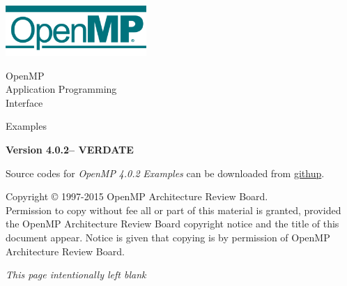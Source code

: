 
\newcommand{\VER}{4.0.2}
\newcommand{\VERDATE}{March 2015}

  \begin{titlepage}
    \begin{flushleft}
     \hspace{-6em} \includegraphics[width=0.4\textwidth]{openmp-logo.png}
    \end{flushleft}

    \begin{adjustwidth}{-0.75in}{0in}
    \begin{center}
      \Huge
      \textsf{OpenMP\\Application Programming\\Interface}

      \vspace{0.5in}\textsf{Examples}\vspace{-0.7in}
      \normalsize

      \vspace{1.0in}

      \textbf{Version \VER -- VERDATE}
    \end{center}
    \end{adjustwidth}

    \vspace{2.3in} %

Source codes for \emph{OpenMP} \emph{\VER} \emph{Examples} can be downloaded from
 \href{https://github.com/OpenMP/Examples/tree/v\VER}{githup}.\\

\begin{adjustwidth}{0pt}{1em}\setlength{\parskip}{0.25\baselineskip}%
Copyright © 1997-2015 OpenMP Architecture Review Board.\\
Permission to copy without fee all or part of this material is granted,
provided the OpenMP Architecture Review Board copyright notice and
the title of this document appear. Notice is given that copying is by
permission of OpenMP Architecture Review Board.\end{adjustwidth}

  \end{titlepage}


\clearpage
\thispagestyle{empty}
\phantom{a}
\emph{This page intentionally left blank}

\vfill

